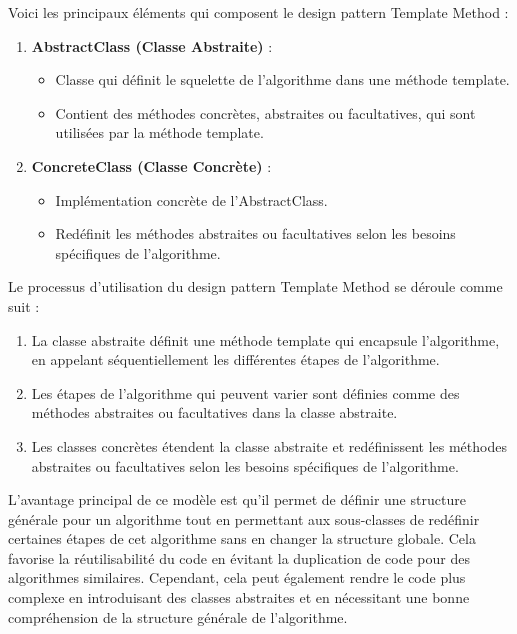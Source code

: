 Voici les principaux éléments qui composent le design pattern Template Method :

\begin{enumerate}[leftmargin=*,labelsep=3mm]
    \item \textbf{AbstractClass (Classe Abstraite)} :
    \begin{itemize}
        \item Classe qui définit le squelette de l'algorithme dans une méthode template.
        \item Contient des méthodes concrètes, abstraites ou facultatives, qui sont utilisées par la méthode template.
    \end{itemize}
    
    \item \textbf{ConcreteClass (Classe Concrète)} :
    \begin{itemize}
        \item Implémentation concrète de l'AbstractClass.
        \item Redéfinit les méthodes abstraites ou facultatives selon les besoins spécifiques de l'algorithme.
    \end{itemize}
\end{enumerate}

Le processus d'utilisation du design pattern Template Method se déroule comme suit :

\begin{enumerate}[leftmargin=*,labelsep=3mm]
    \item La classe abstraite définit une méthode template qui encapsule l'algorithme, en appelant séquentiellement les différentes étapes de l'algorithme.
    \item Les étapes de l'algorithme qui peuvent varier sont définies comme des méthodes abstraites ou facultatives dans la classe abstraite.
    \item Les classes concrètes étendent la classe abstraite et redéfinissent les méthodes abstraites ou facultatives selon les besoins spécifiques de l'algorithme.
\end{enumerate}

L'avantage principal de ce modèle est qu'il permet de définir une structure générale pour un algorithme tout en permettant aux sous-classes de redéfinir certaines étapes de cet algorithme sans en changer la structure globale. Cela favorise la réutilisabilité du code en évitant la duplication de code pour des algorithmes similaires. Cependant, cela peut également rendre le code plus complexe en introduisant des classes abstraites et en nécessitant une bonne compréhension de la structure générale de l'algorithme.



